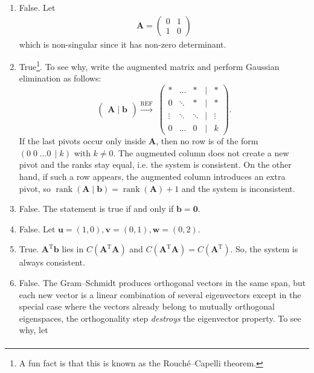 \documentclass[12pt]{article}
\begin{document}
\begin{enumerate}[label=\textbf{(\alph*)}]
    \itemsep 0em
    \item False. Let \begin{align*}
        \mathbf{A}=\begin{pmatrix}
            0 & 1 \\1 & 0
        \end{pmatrix}
    \end{align*}
    which is non-singular since it has non-zero determinant.
     \item True\footnote{A fun fact is that this is known as the Rouché–Capelli theorem.}. To see why, write the augmented matrix and perform Gaussian elimination as follows:
\[
\begin{pmatrix}
    \mathbf{A}\mid \mathbf{b}
\end{pmatrix}\xrightarrow{\text{REF}}\;
\begin{pmatrix}
\ast & \ldots & \ast & | & \ast\\
0 & \ddots & \ast & | & \ast\\
\vdots & \ddots & \ddots & | & \vdots\\
0 & \ldots & 0 & | & k
\end{pmatrix}.
\]
If the last pivots occur only inside \(\mathbf{A}\), then no row is of the form \(\left(0\;0\;\ldots 0\,\mid k\right)\) with \(k\neq0\). The augmented column does not create a new pivot and the ranks stay equal, i.e. the system is consistent.  On the other hand, if such a row appears, the augmented column introduces an extra pivot, so \(\operatorname{rank}\left(\mathbf{A}\mid \mathbf{b}\right)=\operatorname{rank}\left(\mathbf{A}\right)+1\) and the system is inconsistent.   
 \item False. The statement is true if and only if $\mathbf{b}=\mathbf{0}$.
     \item False. Let $\mathbf{u}=\left(1,0\right),\mathbf{v}=\left(0,1\right),\mathbf{w}=\left(0,2\right)$. 
     \item True. $\mathbf{A}^\text{T}\mathbf{b}$ lies in $C\left(\mathbf{A}^\text{T}\mathbf{A}\right)$ and $C\left(\mathbf{A}^\text{T}\mathbf{A}\right)=C\left(\mathbf{A}^\text{T}\right)$. So, the system is always consistent.
     \item False. The Gram–Schmidt produces orthogonal vectors in the same span, but each new vector is a linear combination of several eigenvectors except in the special case where the vectors already belong to mutually orthogonal eigenspaces, the orthogonality step \emph{destroys} the eigenvector property. To see why, let \begin{align*}

\end{align*}
\end{enumerate}
\end{document}
